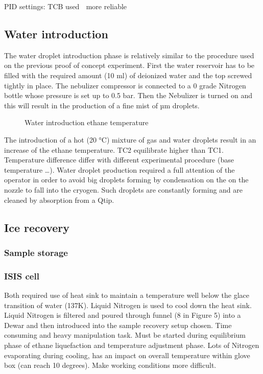 \documentclass[letterpaper,10pt,english]{jupyterBook}
\begin{document}
\sphinxAtStartPar
PID settings:
TCB used  more reliable


\subsection{Water introduction}
\label{\detokenize{Chapter7/Chapter7:water-introduction}}
\sphinxAtStartPar
The water droplet introduction phase is relatively similar to the procedure used on the previous proof of concept experiment. First the water reservoir has to be filled with the required amount (10 ml) of deionized water and the top screwed tightly in place.
The nebulizer compressor is connected to a 0 grade Nitrogen bottle whose pressure is set up to 0.5 bar. Then the Nebulizer is turned on and this will result in the production of a fine mist of µm droplets.

\begin{figure}[htbp]
\centering
\capstart

\noindent{}
\caption{Water introduction ethane temperature}\label{\detokenize{Chapter7/Chapter7:id10}}\end{figure}

\sphinxAtStartPar
The introduction of a hot (20 °C) mixture of gas and water droplets result in an increase of the ethane temperature. TC2 equilibrate higher than TC1. Temperature difference differ with different experimental procedure (base temperature …).
Water droplet production required a full attention of the operator in order to avoid big droplets forming by condensation on the on the nozzle to fall into the cryogen. Such droplets are constantly forming and are cleaned by absorption from a Q\sphinxhyphen{}tip.


\subsection{Ice recovery}
\label{\detokenize{Chapter7/Chapter7:ice-recovery}}

\subsubsection{Sample storage}
\label{\detokenize{Chapter7/Chapter7:id11}}

\subsubsection{ISIS cell}
\label{\detokenize{Chapter7/Chapter7:isis-cell}}
\sphinxAtStartPar
Both required use of heat sink to maintain a temperature well below the glace transition of water (137K). Liquid Nitrogen is used to cool down the heat sink. Liquid Nitrogen is filtered and poured through funnel (8 in Figure 5) into a Dewar and then introduced into the sample recovery setup chosen.
Time consuming and heavy manipulation task. Must be started during equilibrium phase of ethane liquefaction and temperature adjustment phase. Lots of Nitrogen evaporating during cooling, has an impact on overall temperature within glove box (can reach \sphinxhyphen{}10 degrees). Make working conditions more difficult.
\end{document}
